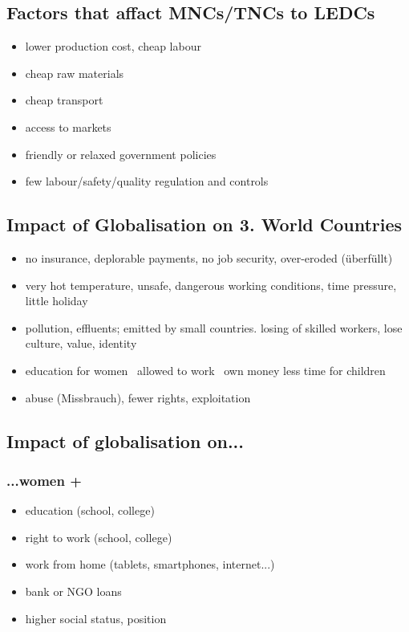 \documentclass[a5paper,12pt,twoside,titlepage]{scrartcl}
\begin{document}
\subsection{Factors that affact MNCs/TNCs to LEDCs}
\begin{itemize}
	\item lower production cost, cheap labour
	\item cheap raw materials
	\item cheap transport
	\item access to markets
	\item friendly or relaxed government policies
	\item few labour/safety/quality regulation and controls
\end{itemize}
\subsection{Impact of Globalisation on 3. World Countries}
\begin{itemize}
	\item no insurance, deplorable payments, no job security, over-eroded (überfüllt) 
	\item very hot temperature, unsafe, dangerous working conditions, time pressure, little holiday
	\item \textrightarrow pollution, effluents; emitted by small countries. losing of skilled workers, lose culture, value, identity
	\item education for women \textrightarrow\ allowed to work \textrightarrow\ own money less time for children
	\item abuse (Missbrauch), fewer rights, exploitation
\end{itemize}

\subsection{Impact of globalisation on...}
\subsubsection{...women +}
	\begin{itemize}
		\item education (school, college)
		\item right to work (school, college)
		\item work from home (tablets, smartphones, internet...) 
		\item bank or NGO loans
		\item higher social status, position
	\end{itemize}
\end{document}
